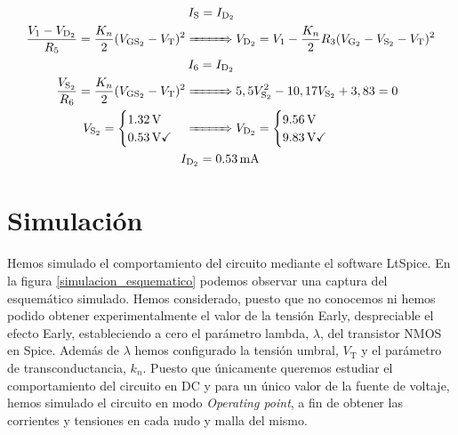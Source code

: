 \documentclass[11pt,a4paper]{article}
\begin{document}
		\begin{align}
			&\hspace{2pt}I_{\mathrm{S}} = I_{\mathrm{D}_2} \\
			\frac{V_1 - V_{\mathrm{D}_2}}{R_5} = \frac{K_n}{2}(V_{\mathrm{GS}_2} - V_{\mathrm{T}})^2 &\xRightarrow{\hspace{27pt}} V_{\mathrm{D}_2} = V_1 - \frac{K_n}{2}R_3(V_{\mathrm{G}_2}-V_{\mathrm{S}_2}-V_{\mathrm{T}})^2 \\
			&\hspace{2pt}I_6 = I_{\mathrm{D}_2} \\
			\frac{V_{\mathrm{S}_2}}{R_6} = \frac{K_n}{2}(V_{\mathrm{GS}_2} - V_{\mathrm{T}})^2 &\xRightarrow{\hspace{27pt}} 5,5V_{\mathrm{S}_2}^2 - 10,17V_{\mathrm{S}_2} + 3,83 = 0 \\
			V_{\mathrm{S}_2} =
			\begin{cases}
				\SI{1,32}{\volt} \\
				\SI{0,53}{\volt} \checkmark
			\end{cases} &\xRightarrow{\hspace{27pt}}
			V_{\mathrm{D}_2} =
			\begin{cases}
				\SI{9,56}{\volt} \\
				\SI{9,83}{\volt} \checkmark
			\end{cases} \\
			&\hspace{-4pt}I_{\mathrm{D}_2} = \SI{0,53}{\milli\ampere}
		\end{align}

		\section{Simulación}

		Hemos simulado el comportamiento del circuito mediante el software LtSpice. En la figura \ref{simulacion_esquematico} podemos observar una captura del esquemático simulado. Hemos considerado, puesto que no conocemos ni hemos podido obtener experimentalmente el valor de la tensión Early, despreciable el efecto Early, estableciendo a cero el parámetro lambda, $\lambda$, del transistor NMOS en Spice. Además de $\lambda$ hemos configurado la tensión umbral, $V_\mathrm{T}$ y el parámetro de transconductancia, $k_n$. Puesto que únicamente queremos estudiar el comportamiento del circuito en DC y para un único valor de la fuente de voltaje, hemos simulado el circuito en modo \emph{Operating point}, a fin de obtener las corrientes y tensiones en cada nudo y malla del mismo.
\end{document}
